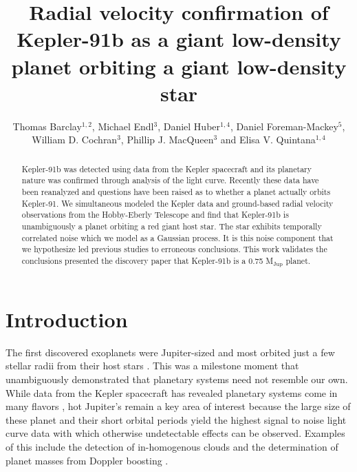 \documentclass[apjl]{emulateapj}
\begin{document}
\title{Radial velocity confirmation of Kepler-91\lowercase{b} as a giant low-density planet orbiting a giant low-density star}
\author{Thomas Barclay$^{1,2}$, Michael Endl$^{3}$, Daniel Huber$^{1,4}$,  Daniel Foreman-Mackey$^{5}$, William D. Cochran$^{3}$, Phillip J. MacQueen$^{3}$ and Elisa V. Quintana$^{1,4}$}



\begin{abstract}
Kepler-91b was detected using data from the Kepler spacecraft and its planetary nature was confirmed through analysis of the light curve. Recently these data have been reanalyzed and questions have been raised as to whether a planet actually orbits Kepler-91. We simultaneous modeled the Kepler data and ground-based radial velocity observations from the Hobby-Eberly Telescope and find that Kepler-91b is unambiguously a planet orbiting a red giant host star. The star exhibits temporally correlated noise which we model as a Gaussian process. It is this noise component that we hypothesize led previous studies to erroneous conclusions. This work validates the conclusions presented the discovery paper that Kepler-91b is a 0.75 M$_{\textrm{Jup}}$ planet. 
\end{abstract}

\section{Introduction}
The first discovered exoplanets were Jupiter-sized \citep{campbell88} and most orbited just a few stellar radii from their host stars \citep{mayor95,marcy96}. This was a milestone moment that unambiguously demonstrated that planetary systems need not resemble our own. While data from the Kepler spacecraft has revealed planetary systems come in many flavors \citep[e.g.][]{lissauer11,carter12,barclay13}, hot Jupiter's remain a key area of interest because the large size of these planet and their short orbital periods yield the highest signal to noise light curve data with which otherwise undetectable effects can be observed. Examples of this include the detection of in-homogenous clouds \citep{demory13} and the determination of planet masses from Doppler boosting \citep{shporer11,barclay12}.
\end{document}
